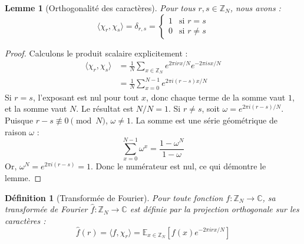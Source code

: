 \documentclass[12pt, a4paper]{article}
\newtheorem{lemma}[theorem]{Lemme}
\newtheorem{definition}[theorem]{Définition}
\begin{document}
\begin{lemma}[Orthogonalité des caractères]
Pour tous $r, s \in \mathbb{Z}_N$, nous avons :
\begin{equation}
\langle \chi_r, \chi_s \rangle = \delta_{r,s} = \begin{cases} 1 & \text{si } r = s \\ 0 & \text{si } r \neq s \end{cases}
\end{equation}
\end{lemma}
\begin{proof}
Calculons le produit scalaire explicitement :
\begin{align}
\langle \chi_r, \chi_s \rangle &= \frac{1}{N} \sum_{x \in \mathbb{Z}_N} e^{2\pi i r x / N} e^{-2\pi i s x / N} \\
&= \frac{1}{N} \sum_{x = 0}^{N-1} e^{2\pi i (r - s) x / N}
\end{align}
Si $r = s$, l'exposant est nul pour tout $x$, donc chaque terme de la somme vaut $1$, et la somme vaut $N$. Le résultat est $N/N = 1$.
Si $r \neq s$, soit $\omega = e^{2\pi i (r - s) / N}$. Puisque $r - s \not\equiv 0 \pmod N$, $\omega \neq 1$. La somme est une série géométrique de raison $\omega$ :
\begin{equation}
\sum_{x = 0}^{N-1} \omega^x = \frac{1 - \omega^N}{1 - \omega}
\end{equation}
Or, $\omega^N = e^{2\pi i (r - s)} = 1$. Donc le numérateur est nul, ce qui démontre le lemme.
\end{proof}

\begin{definition}[Transformée de Fourier]
Pour toute fonction $f : \mathbb{Z}_N \to \mathbb{C}$, sa transformée de Fourier $\widehat{f} : \mathbb{Z}_N \to \mathbb{C}$ est définie par la projection orthogonale sur les caractères :
\begin{equation}
\widehat{f}(r) = \langle f, \chi_r \rangle = \mathbb{E}_{x \in \mathbb{Z}_N} [f(x) e^{-2\pi i r x / N}]
\end{equation}
\end{definition}
\end{document}
